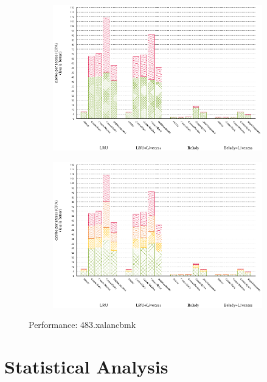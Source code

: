 \documentclass[onecolumn, openright, master, english, signatures]{dbrgrptt}
\begin{document}
\begin{figure}[!ht]
  \begin{subfigure}[b]{0.5\textwidth}%
    \includegraphics[width=\textwidth]{figs/plots/perf-misses-483-xalancbmk.eps}
    \label{fig:performance-483-xalancbmk-misses}
  \end{subfigure}%
  \begin{subfigure}[b]{0.5\textwidth}%
    \includegraphics[width=\textwidth]{figs/plots/perf-483-xalancbmk.eps}
    \label{fig:performance-483-xalancbmk-memops}
  \end{subfigure}%
  \caption{Performance: 483.xalancbmk}
  \label{fig:performance-483-xalancbmk}
\end{figure}

\section{Statistical Analysis}
\label{sec:experiment-statistical-analysis}
\end{document}
